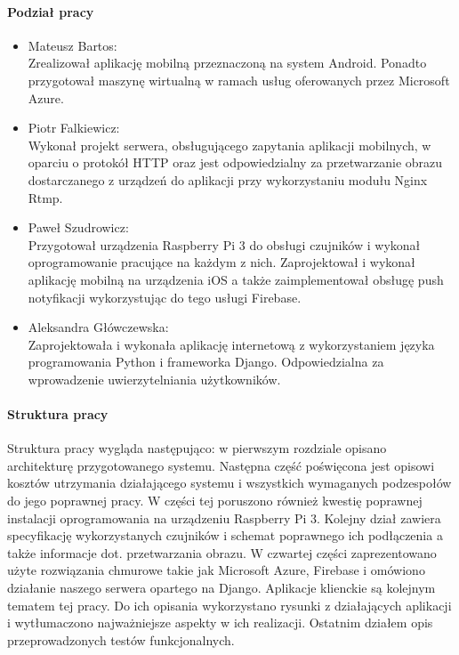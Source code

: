 \paragraph{Podział pracy}
\begin{itemize}
\item Mateusz Bartos: \\
Zrealizował aplikację mobilną przeznaczoną na system Android. Ponadto przygotował maszynę wirtualną w ramach usług oferowanych przez Microsoft Azure.
\item Piotr Falkiewicz: \\
Wykonał projekt serwera, obsługującego zapytania aplikacji mobilnych, w oparciu o protokół HTTP oraz jest odpowiedzialny za przetwarzanie obrazu dostarczanego z urządzeń do aplikacji przy wykorzystaniu modułu Nginx Rtmp. 
\item Paweł Szudrowicz: \\
Przygotował urządzenia Raspberry Pi 3 do obsługi czujników i wykonał oprogramowanie pracujące na każdym z nich. Zaprojektował i wykonał aplikację mobilną na urządzenia iOS a także zaimplementował obsługę push notyfikacji wykorzystując do tego usługi Firebase.
\item Aleksandra Główczewska: \\
Zaprojektowała i wykonała aplikację internetową z wykorzystaniem języka programowania Python i frameworka Django. Odpowiedzialna za wprowadzenie uwierzytelniania użytkowników.
\end{itemize}

\paragraph{Struktura pracy}

Struktura pracy wygląda następująco: w pierwszym rozdziale opisano architekturę przygotowanego systemu. Następna część poświęcona jest opisowi kosztów utrzymania działającego systemu i wszystkich wymaganych podzespołów do jego poprawnej pracy. W części tej poruszono również kwestię poprawnej instalacji oprogramowania na urządzeniu Raspberry Pi 3. Kolejny dział zawiera specyfikację wykorzystanych czujników i schemat poprawnego ich podłączenia a także informacje dot. przetwarzania obrazu. W czwartej części zaprezentowano użyte rozwiązania chmurowe takie jak Microsoft Azure, Firebase i omówiono działanie naszego serwera opartego na Django. Aplikacje klienckie są kolejnym tematem tej pracy. Do ich opisania wykorzystano rysunki z działających aplikacji i wytłumaczono najważniejsze aspekty w ich realizacji. Ostatnim działem opis przeprowadzonych testów funkcjonalnych.